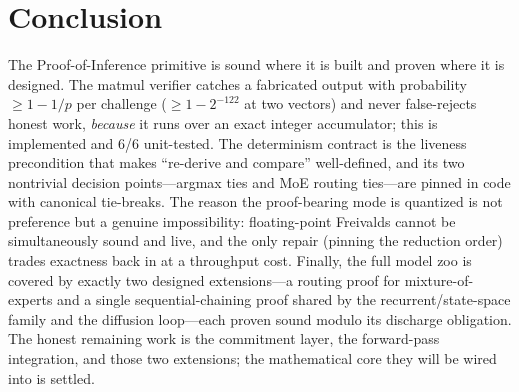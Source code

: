 \documentclass[11pt]{article}
\begin{document}
\section{Conclusion}

The Proof-of-Inference primitive is sound where it is built and proven where it is designed.
The matmul verifier catches a fabricated output with probability $\ge 1 - 1/p$ per challenge
($\ge 1 - 2^{-122}$ at two vectors) and never false-rejects honest work, \emph{because} it runs
over an exact integer accumulator; this is implemented and 6/6 unit-tested. The determinism
contract is the liveness precondition that makes ``re-derive and compare'' well-defined, and
its two nontrivial decision points---argmax ties and MoE routing ties---are pinned in code with
canonical tie-breaks. The reason the proof-bearing mode is quantized is not preference but a
genuine impossibility: floating-point Freivalds cannot be simultaneously sound and live, and
the only repair (pinning the reduction order) trades exactness back in at a throughput cost.
Finally, the full model zoo is covered by exactly two designed extensions---a routing proof for
mixture-of-experts and a single sequential-chaining proof shared by the recurrent/state-space
family and the diffusion loop---each proven sound modulo its discharge obligation. The honest
remaining work is the commitment layer, the forward-pass integration, and those two extensions;
the mathematical core they will be wired into is settled.
\end{document}
